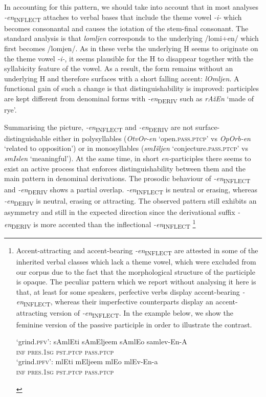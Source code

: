 \documentclass[output=paper]{langsci/langscibook}
\begin{document}
In accounting for this pattern, we should take into account that in most analyses \textit{-en}\textsubscript{INFLECT} attaches to verbal bases that include the theme vowel \textit{-i-} which becomes consonantal and causes the iotation of the stem-final consonant. The standard analysis is that \textit{lomljen} corresponds to the underlying /lomi+en/ which first becomes /lomjen/. As in these verbs the underlying H seems to originate on the theme vowel \textit{-i-}, it seems plausible for the H to disappear together with the syllabicity feature of the vowel. As a result, the form remains without an underlying H and therefore surfaces with a short falling accent: \textit{lOmljen}. A functional gain of such a change is that distinguishability is improved: participles are kept different from denominal forms with \textit{{-en}}\textsubscript{DERIV}  such as \textit{rAžEn} `made of rye'.

Summarising the picture, \textit{{-en}}\textsubscript{INFLECT}  and \textit{{-en}}\textsubscript{DERIV}  are not surface-distin\-guish\-able either in polysyllables (\textit{OtvOr-en} `open.\textsc{pass.ptcp}' vs \textit{OpOrb-en}  `related to opposition') or in monosyllables (\textit{smIšljen} `conjecture.\textsc{pass.ptcp}' vs \textit{smIslen} `meaningful'). At the same time, in short \textit{en-}participles there seems to exist an active process that enforces distinguishability between them and the main pattern in denominal derivations. 
The prosodic behaviour of \textit{-en}\textsubscript{INFLECT} and \textit{-en}\textsubscript{DERIV} shows a partial overlap. \textit{-en}\textsubscript{INFLECT} is neutral or erasing, whereas \textit{-en}\textsubscript{DERIV} is neutral, erasing or attracting. The observed pattern still exhibits an asymmetry and still in the expected direction since  the derivational suffix \textit{-en}\textsubscript{DERIV} is more accented than the inflectional \textit{-en}\textsubscript{INFLECT}
\footnote{Accent-attracting and accent-bearing \textit{-en}\textsubscript{INFLECT} are attested in some of the inherited verbal classes which lack a theme vowel, which were excluded from our corpus due to the fact that the morphological structure of the participle is opaque. The peculiar pattern which we report without analysing it here is that, at least for some speakers, perfective verbs display accent-bearing \textit{-en}\textsubscript{INFLECT}, whereas their imperfective counterparts display an accent-attracting version of \textit{-en}\textsubscript{INFLECT}. In the example below, we show the feminine version of the passive participle in order to illustrate the contrast. 
\ea
		\begin{xlist} \ex `grind.\textsc{pfv}': \gll
		sAmlEti	sAmEljeem	sAmlEo samlev-En-A \\
        \textsc{inf} \textsc{pres.1sg} \textsc{pst.ptcp} \textsc{pass.ptcp}
\\ 
\ex `grind.\textsc{ipfv}': \gll  mlEti	mEljeem	mlEo mlEv-En-a 
\\ \textsc{inf} \textsc{pres.1sg} \textsc{pst.ptcp} \textsc{pass.ptcp} \\ 
		\glt
	\end{xlist}
	\z
}
\end{document}

